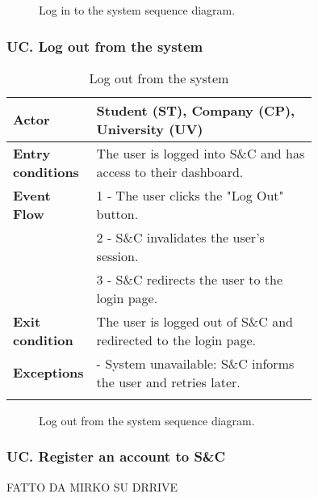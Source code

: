 \begin{figure}[H]
    \begin{center}
        
        \caption{Log in to the system sequence diagram.}
        \label{fig:login_seqd}%
    \end{center}
\end{figure}

\subsubsection*{UC\cuc . Log out from the system}
\begin{center}
    \begin{longtable}{|l|p{0.75\linewidth}|}
        \hline
        \textbf{Actor}            & Student (ST), Company (CP), University (UV) \\
        \hline
        \textbf{Entry conditions} & The user is logged into S\&C and has access to their dashboard. \\
        \hline
        \textbf{Event Flow}       & 1 - The user clicks the "Log Out" button. \\
                                  & 2 - S\&C invalidates the user's session. \\
                                  & 3 - S\&C redirects the user to the login page. \\
        \hline
        \textbf{Exit condition}   & The user is logged out of S\&C and redirected to the login page. \\       
        \hline
        \textbf{Exceptions}       & - System unavailable: S\&C informs the user and retries later. \\
        \hline
        \caption{Log out from the system}
        \label{tab:logout_usecase}
    \end{longtable}
\end{center}

\begin{figure}[H]
    \begin{center}
        
        \caption{Log out from the system sequence diagram.}
        \label{fig:logout_seqd}%
    \end{center}
\end{figure}

\subsubsection*{UC\cuc . Register an account to S\&C}
FATTO DA MIRKO SU DRRIVE

